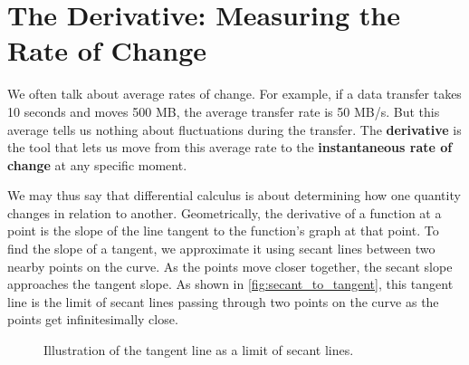 \section{The Derivative: Measuring the Rate of Change}
\label{sec:ch10-derivative}

We often talk about average rates of change. For example, if a data transfer takes 10 seconds and moves 500 MB, the average transfer rate is 50 MB/s. But this average tells us nothing about fluctuations during the transfer. The \textbf{derivative} is the tool that lets us move from this average rate to the \textbf{instantaneous rate of change} at any specific moment.

We may thus say that differential calculus is about determining how one quantity changes in relation to another. Geometrically, the derivative of a function at a point is the slope of the line tangent to the function's graph at that point. To find the slope of a tangent, we approximate it using secant lines between two nearby points on the curve. As the points move closer together, the secant slope approaches the tangent slope. As shown in \autoref{fig:secant_to_tangent}, this tangent line is the limit of secant lines passing through two points on the curve as the points get infinitesimally close.

\begin{figure}[htbp]
    \centering
    \caption{Illustration of the tangent line as a limit of secant lines.}
    \label{fig:secant_to_tangent}
    \end{figure}
    
